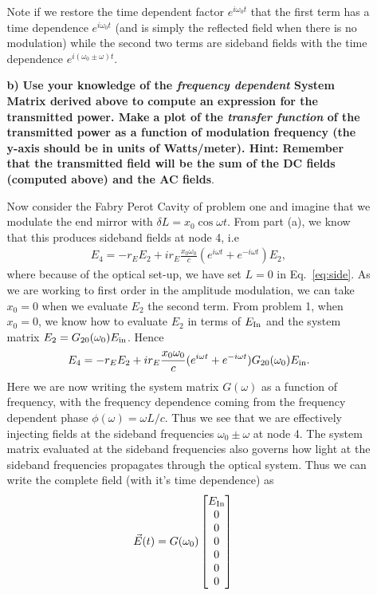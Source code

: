 \documentclass[11pt]{article}
\begin{document}
\begin{enumerate}
\begin{itemize}
Note if we restore the time dependent factor $e^{i\omega_0t}$ that the first term has a time dependence $e^{i\omega_0t}$ (and is simply the reflected field when there is no modulation) while the second two terms are sideband fields with the time dependence $e^{i(\omega_0\pm\omega)t}$.

\item[\bf b)] {\bf Use your knowledge of the \emph{frequency dependent} System Matrix derived above to compute an expression for the transmitted power. Make a plot of the \emph{transfer function} of the transmitted power as a function of modulation frequency (the y-axis should be in units of Watts/meter).
\textbf{Hint:} Remember that the transmitted field will be the sum of the DC fields (computed above) and the AC fields}.

Now consider the Fabry Perot Cavity of problem one and imagine that we modulate the end mirror with $\delta L =x_0 \cos\omega t$. From part (a), we know that this produces sideband fields at node 4, i.e
\begin{align}
E_4=-r_E E_2+ir_E\frac{x_0\omega_0}{c}(e^{i\omega t}+e^{-i\omega t})E_{2},
\end{align}
where because of the optical set-up, we have set $L=0$ in Eq.~\eqref{eq:side}. As we are working to first order in the amplitude modulation, we can take $x_0=0$ when we evaluate $E_2$ the second term. From problem 1, when $x_0=0$, we know how to evaluate $E_2$ in terms of $E_{\rm In}$ and the system matrix $E_2=G_{20}(\omega_0)E_{\rm in}$. Hence
\begin{align}
E_4=-r_E E_2+ir_E\frac{x_0\omega_0}{c}(e^{i\omega t}+e^{-i\omega t})G_{20}(\omega_0)E_{\rm in}.
\end{align}
Here we are now writing the system matrix $G(\omega)$ as a function of frequency, with the frequency dependence coming from the frequency dependent phase $\phi(\omega)=\omega L/c$. Thus we see that we are effectively injecting fields at the sideband frequencies $\omega_0\pm \omega$ at node 4. The system matrix evaluated at the sideband frequencies also governs how light at the sideband frequencies propagates through the optical system. Thus we can write the complete field (with it's time dependence) as 
\begin{align}
\vec E(t)&=G(\omega_0)
\begin{bmatrix}
E_{\rm In} \\ 0 \\0 \\0 \\0 \\0 \\0

\end{bmatrix}
\end{align}
\end{itemize}
\end{enumerate}
\end{document}
